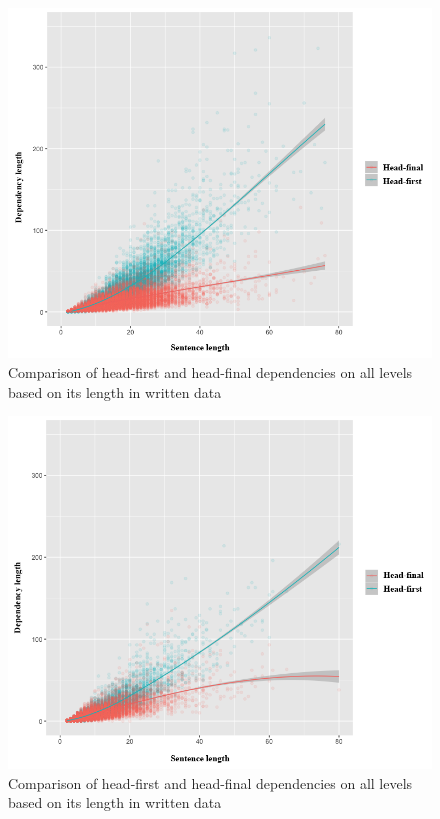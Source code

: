 \documentclass[10pt, a4paper, conference, compsocconf]{IEEEtran}
\begin{document}
\begin{figure}
\centering
  \includegraphics[width=1\linewidth] {pics/tulis_DLposneg.png} 
	\caption{Comparison of head-first and head-final dependencies on all levels based on its length in written data}
	\label{fig:tulis_DLposneg} 
\end{figure}
%
\begin{figure}
  \centering
  \includegraphics[width=1\linewidth]{pics/lisan_DLposneg.png} 
	\caption{Comparison of head-first and head-final dependencies on all levels based on its length in written data}
	\label{fig:lisan_DLposneg} 
\end{figure}
\end{document}
